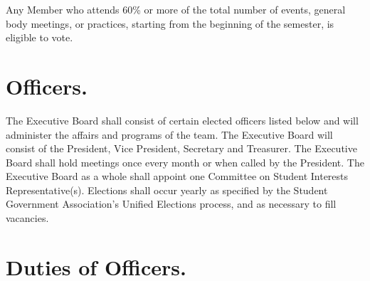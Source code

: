 \documentclass[12pt]{constitution}
\begin{document}


Any Member who attends 60\% or more of the total number of events, general body
meetings, or practices, starting from the beginning of the semester, is eligible
to vote.

\label{art:EXECUTIVE-BOARD}

\section{Officers.}\label{art:OFFICERS}

The Executive Board shall consist of certain elected officers listed below and
will administer the affairs and programs of the team. The Executive Board will
consist of the President, Vice President, Secretary and Treasurer. The Executive
Board shall hold meetings once every month or when called by the President. The
Executive Board as a whole shall appoint one Committee on Student Interests
Representative(s). Elections shall occur yearly as specified by the Student
Government Association’s Unified Elections process, and as necessary to fill
vacancies.

\section{Duties of Officers.}\label{sec:DUTIES}
\end{document}
